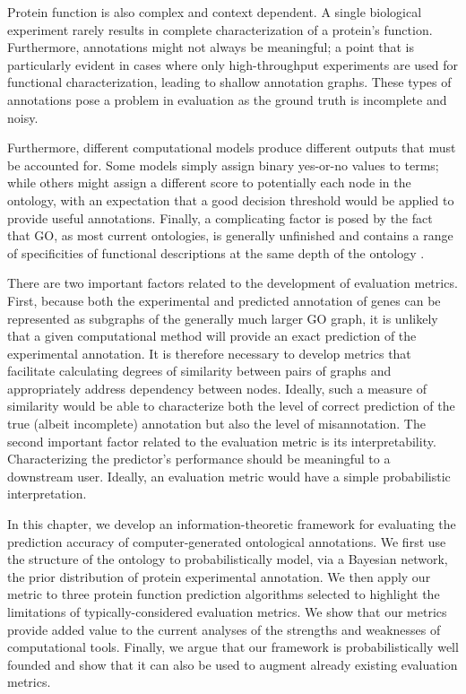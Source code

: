 Protein function is also complex and context dependent. A single biological experiment rarely results in complete characterization of a protein's function. Furthermore, annotations might not always be meaningful; a point that is particularly evident in cases where only high-throughput experiments are used for functional characterization, leading to shallow annotation graphs. These types of annotations pose a problem in evaluation as the ground truth is incomplete and noisy. 

Furthermore, different computational models produce different outputs that must be accounted for. Some models simply assign binary yes-or-no values to terms; while others might assign a different score to potentially each node in the ontology, with an expectation that a good decision threshold would be applied to provide useful annotations.
Finally, a complicating factor is posed by the fact that GO, as most current ontologies, is generally unfinished and contains a range of specificities of functional descriptions at the same depth of the ontology \citep{alterovitz2010}.

There are two important factors related to the development of evaluation metrics. First, because both the experimental and predicted annotation of genes can be represented as subgraphs of the generally much larger GO graph, it is unlikely that a given computational method will provide an exact prediction of the experimental annotation. It is therefore necessary to develop metrics that facilitate calculating degrees of similarity between pairs of graphs and appropriately address dependency between nodes. Ideally, such a measure of similarity would be able to characterize both the level of correct prediction of the true (albeit incomplete) annotation but also the level of misannotation. The second important factor related to the evaluation metric is its interpretability. Characterizing the predictor's performance should be meaningful to a downstream user. Ideally, an evaluation metric would have a simple probabilistic interpretation. 

In this chapter, we develop an information-theoretic framework for evaluating the prediction accuracy of computer-generated ontological annotations. We first use the structure of the ontology to probabilistically model, via a Bayesian network, the prior distribution of protein experimental annotation. We then apply our metric to three protein function prediction algorithms selected to highlight the limitations of typically-considered evaluation metrics. We show that our metrics provide added value to the current analyses of the strengths and weaknesses of computational tools. Finally, we argue that our framework is probabilistically well founded and show that it can also be used to augment already existing evaluation metrics.

